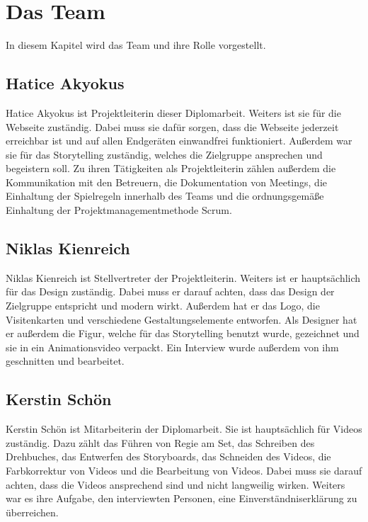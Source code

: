 \chapter{Das Team}
In diesem Kapitel wird das Team und ihre Rolle vorgestellt.
 
\section{Hatice Akyokus}

Hatice Akyokus ist Projektleiterin dieser Diplomarbeit. Weiters ist sie für die Webseite zuständig. Dabei muss sie dafür sorgen, dass die Webseite jederzeit erreichbar ist und auf allen Endgeräten einwandfrei funktioniert. Außerdem war sie für das Storytelling zuständig, welches die Zielgruppe ansprechen und begeistern soll. Zu ihren Tätigkeiten als Projektleiterin zählen außerdem die Kommunikation mit den Betreuern, die Dokumentation von Meetings, die Einhaltung der Spielregeln innerhalb des Teams und die ordnungsgemäße Einhaltung der Projektmanagementmethode Scrum.

\section{Niklas Kienreich}
Niklas Kienreich ist Stellvertreter der Projektleiterin. Weiters ist er hauptsächlich für das Design zuständig. Dabei muss er darauf achten, dass das Design der Zielgruppe entspricht und modern wirkt. Außerdem hat er das Logo, die Visitenkarten und verschiedene Gestaltungselemente entworfen. Als Designer hat er außerdem die Figur, welche für das Storytelling benutzt wurde, gezeichnet und sie in ein Animationsvideo verpackt. Ein Interview wurde außerdem von ihm geschnitten und bearbeitet.

\section{Kerstin Schön}
Kerstin Schön ist Mitarbeiterin der Diplomarbeit. Sie ist hauptsächlich für Videos zuständig. Dazu zählt das Führen von Regie am Set, das Schreiben des Drehbuches, das Entwerfen des Storyboards, das Schneiden des Videos, die Farbkorrektur von Videos und die Bearbeitung von Videos. Dabei muss sie darauf achten, dass die Videos ansprechend sind und nicht langweilig wirken. Weiters war es ihre Aufgabe, den interviewten Personen, eine Einverständniserklärung zu überreichen.
 